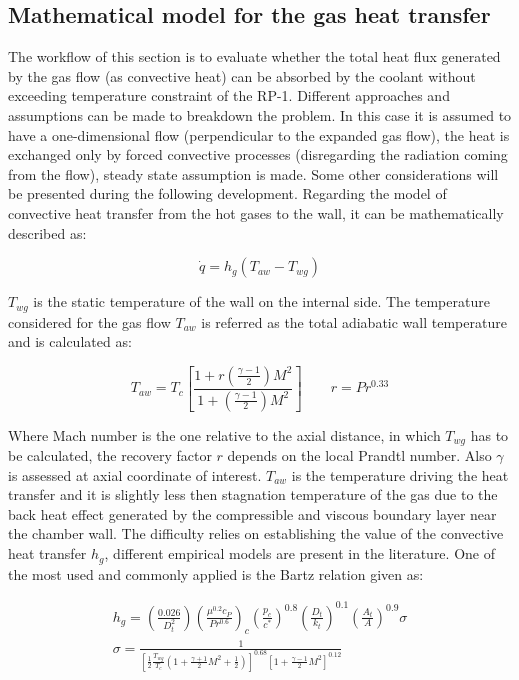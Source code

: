 \subsection{Mathematical model for the gas heat transfer}
\label{subsec:math_cooling}

The workflow of this section is to evaluate whether the total heat flux generated by the gas flow (as convective heat) can be absorbed by the coolant without exceeding temperature constraint of the RP-1. Different approaches and assumptions can be made to breakdown the problem. In this case it is assumed to have a one-dimensional flow (perpendicular to the expanded gas flow), the heat is exchanged only by forced convective processes (disregarding the radiation coming from the flow), steady state assumption is made. Some other considerations will be presented during the following development.
Regarding the model of convective heat transfer from the hot gases to the wall, it can be mathematically described as:

\begin{equation}
    \dot{q} = h_g (T_{aw} - T_{wg})
\end{equation}

$T_{wg}$ is the static temperature of the wall on the internal side. The temperature considered for the gas flow $T_{aw}$ is referred as the total adiabatic wall temperature and is calculated as:

\begin{equation}
    T_{aw} = T_c \left[\frac{1 + r\left(\frac{\gamma - 1}{2}\right)M^2}{1 + \left(\frac{\gamma - 1}{2}\right)M^2}\right] \qquad r = Pr^{0.33}
\end{equation}

\vspace*{3mm}
Where Mach number is the one relative to the axial distance, in which $T_{wg}$ has to be calculated, the recovery factor $r$ depends on the local Prandtl number. Also $\gamma$ is assessed at axial coordinate of interest.
$T_{aw}$ is the temperature driving the heat transfer and it is slightly less then stagnation temperature of the gas due to the back heat effect generated by the compressible and viscous boundary layer near the chamber wall. The difficulty relies on establishing the value of the convective heat transfer $h_g$, different empirical models are present in the literature. One of the most used and commonly applied is the Bartz relation given as:


\begin{gather}
    h_g = \left(\frac{0.026}{D_t^2}\right) \left(\frac{\mu^{0.2} c_P}{Pr^{0.6}}\right)_{c} \left(\frac{p_c}{c^*}\right)^{0.8} \left(\frac{D_t}{k_t} \right)^{0.1} \left(\frac{A_t}{A}\right)^{0.9} \sigma
    \label{eq:h_g}
    \\[5pt]
    \sigma = \frac{1}{\left[\frac{1}{2}\frac{T_{wg}}{T_c} \left( 1 + \frac{\gamma + 1}{2}M^2 +\frac{1}{2} \right)\right]^{0.68} \left[1 + \frac{\gamma - 1}{2}M^2 \right]^{0.12}}
    \label{eq:sigma}
\end{gather}

